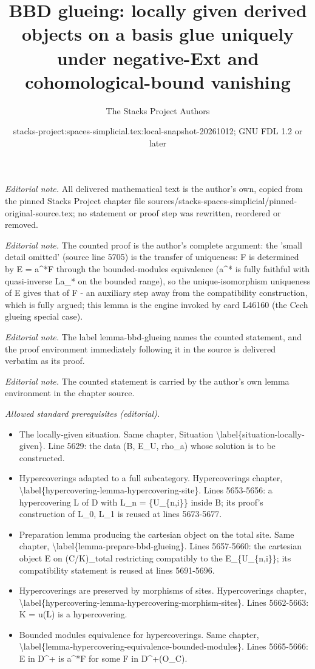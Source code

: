 \documentclass{stacks-project}
\title{BBD glueing: locally given derived objects on a basis glue uniquely under negative-Ext and cohomological-bound vanishing}
\author{The Stacks Project Authors}
\date{stacks-project:spaces-simplicial.tex:local-snapshot-20261012; GNU FDL 1.2 or later}
\theoremstyle{plain}
\theoremstyle{definition}
\theoremstyle{remark}
\numberwithin{equation}{subsection}
\begin{document}
\maketitle
\noindent\textit{Editorial note.} All delivered mathematical text is the author's own, copied from the pinned Stacks Project chapter file sources/stacks-spaces-simplicial/pinned-original-source.tex; no statement or proof step was rewritten, reordered or removed.\par\medskip
\noindent\textit{Editorial note.} The counted proof is the author's complete argument: the 'small detail omitted' (source line 5705) is the transfer of uniqueness: F is determined by E = a\textasciicircum{}*F through the bounded-modules equivalence (a\textasciicircum{}* is fully faithful with quasi-inverse La\_* on the bounded range), so the unique-isomorphism uniqueness of E gives that of F - an auxiliary step away from the compatibility construction, which is fully argued; this lemma is the engine invoked by card L46160 (the Cech glueing special case).\par\medskip
\noindent\textit{Editorial note.} The label lemma-bbd-glueing names the counted statement, and the proof environment immediately following it in the source is delivered verbatim as its proof.\par\medskip
\noindent\textit{Editorial note.} The counted statement is carried by the author's own lemma environment in the chapter source.\par\medskip
\noindent\textit{Allowed standard prerequisites (editorial).}\begin{itemize}
\item The locally-given situation. Same chapter, Situation \textbackslash{}label\{situation-locally-given\}. Line 5629: the data (B, E\_U, rho\_a) whose solution is to be constructed.
\item Hypercoverings adapted to a full subcategory. Hypercoverings chapter, \textbackslash{}label\{hypercovering-lemma-hypercovering-site\}. Lines 5653-5656: a hypercovering L of D with L\_n = \{U\_\{n,i\}\} inside B; its proof's construction of L\_0, L\_1 is reused at lines 5673-5677.
\item Preparation lemma producing the cartesian object on the total site. Same chapter, \textbackslash{}label\{lemma-prepare-bbd-glueing\}. Lines 5657-5660: the cartesian object E on (C/K)\_total restricting compatibly to the E\_\{U\_\{n,i\}\}; its compatibility statement is reused at lines 5691-5696.
\item Hypercoverings are preserved by morphisms of sites. Hypercoverings chapter, \textbackslash{}label\{hypercovering-lemma-hypercovering-morphism-sites\}. Lines 5662-5663: K = u(L) is a hypercovering.
\item Bounded modules equivalence for hypercoverings. Same chapter, \textbackslash{}label\{lemma-hypercovering-equivalence-bounded-modules\}. Lines 5665-5666: E in D\textasciicircum{}+ is a\textasciicircum{}*F for some F in D\textasciicircum{}+(O\_C).
\end{itemize}\medskip
\end{document}
